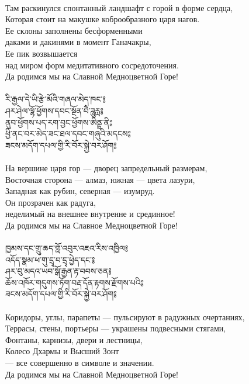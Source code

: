\\
Там раскинулся спонтанный ландшафт с горой в форме сердца,\\
Которая стоит на макушке коброобразного царя нагов.\\
Ее склоны заполнены бесформенными \\ \indent даками и дакинями в момент Ганачакры,\\
Ее пик возвышается \\ \indent над миром форм медитативного сосредоточения.\\
Да родимся мы на Славной Медноцветной Горе!\\
\\
{\ti རི་རྒྱལ་དེ་ཡི་རྩེ་མོའི་གཞལ་མེད་ཁང་༔\\
ཤར་ཤེལ་ལྷོ་ཕྱོགས་དབང་སྔོན་བཻ་ཌཱུརྻ༔\\
ནུབ་ཕྱོགས་པད་རག་བྱང་ཕྱོགས་ཨིནྡྲ་ནི༔\\
ཕྱི་ནང་བར་མེད་ཟང་ཐལ་དབང་གཞུའི་མདངས༔\\
ཟངས་མདོག་དཔལ་གྱི་རི་བོར་སྐྱེ་བར་ཤོག༔}\\
\\
На вершине царя гор — дворец запредельный размерам,\\
Восточная сторона — алмаз, южная — цвета лазури,\\
Западная как рубин, северная — изумруд.\\
Он прозрачен как радуга, \\ \indent неделимый на внешнее внутренне и срединное!\\
Да родимся мы на Славное Медноцветной Горе!\\
\\
\newpage
{\ti ཁྱམས་དང་གྲུ་ཆད་གློ་འབུར་འཇའ་རིས་འཁྱིལ༔\\
འདོད་སྣམ་ཕ་གུ་དྲྭ་བ་དྲྭ་ཕྱེད་དང་༔\\
ཤར་བུ་མདའ་ཡབ་སྒོ་རྒྱན་རྟ་བབས་ཅན༔\\
ཆོས་འཁོར་གདུགས་ཏོག་བརྡ་དོན་རྟགས་རྫོགས་པའི༔\\
ཟངས་མདོག་དཔལ་གྱི་རི་བོར་སྐྱེ་བར་ཤོག༔}\\
\\
Коридоры, углы, парапеты — пульсируют в радужных очертаниях,\\
Террасы, стены, портьеры — украшены подвесными стягами,\\
Фонтаны, карнизы, двери и лестницы,\\
Колесо Дхармы и Высший Зонт \\ \indent — все совершенно в символе и значении.\\
Да родимся мы на Славной Медноцветной Горе!\\
